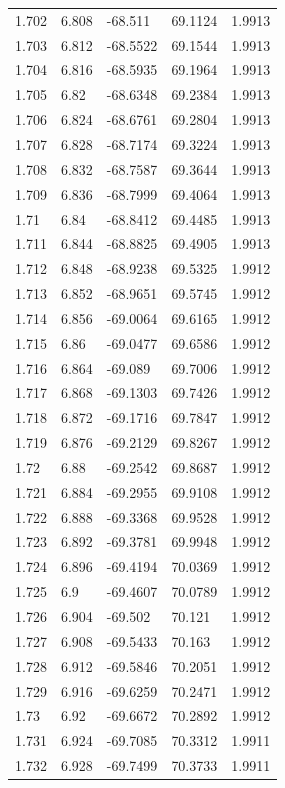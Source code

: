 \begin{tabular}{lllll}
1.702 & 6.808 & -68.511 & 69.1124 & 1.9913 \\
1.703 & 6.812 & -68.5522 & 69.1544 & 1.9913 \\
1.704 & 6.816 & -68.5935 & 69.1964 & 1.9913 \\
1.705 & 6.82 & -68.6348 & 69.2384 & 1.9913 \\
1.706 & 6.824 & -68.6761 & 69.2804 & 1.9913 \\
1.707 & 6.828 & -68.7174 & 69.3224 & 1.9913 \\
1.708 & 6.832 & -68.7587 & 69.3644 & 1.9913 \\
1.709 & 6.836 & -68.7999 & 69.4064 & 1.9913 \\
1.71 & 6.84 & -68.8412 & 69.4485 & 1.9913 \\
1.711 & 6.844 & -68.8825 & 69.4905 & 1.9913 \\
1.712 & 6.848 & -68.9238 & 69.5325 & 1.9912 \\
1.713 & 6.852 & -68.9651 & 69.5745 & 1.9912 \\
1.714 & 6.856 & -69.0064 & 69.6165 & 1.9912 \\
1.715 & 6.86 & -69.0477 & 69.6586 & 1.9912 \\
1.716 & 6.864 & -69.089 & 69.7006 & 1.9912 \\
1.717 & 6.868 & -69.1303 & 69.7426 & 1.9912 \\
1.718 & 6.872 & -69.1716 & 69.7847 & 1.9912 \\
1.719 & 6.876 & -69.2129 & 69.8267 & 1.9912 \\
1.72 & 6.88 & -69.2542 & 69.8687 & 1.9912 \\
1.721 & 6.884 & -69.2955 & 69.9108 & 1.9912 \\
1.722 & 6.888 & -69.3368 & 69.9528 & 1.9912 \\
1.723 & 6.892 & -69.3781 & 69.9948 & 1.9912 \\
1.724 & 6.896 & -69.4194 & 70.0369 & 1.9912 \\
1.725 & 6.9 & -69.4607 & 70.0789 & 1.9912 \\
1.726 & 6.904 & -69.502 & 70.121 & 1.9912 \\
1.727 & 6.908 & -69.5433 & 70.163 & 1.9912 \\
1.728 & 6.912 & -69.5846 & 70.2051 & 1.9912 \\
1.729 & 6.916 & -69.6259 & 70.2471 & 1.9912 \\
1.73 & 6.92 & -69.6672 & 70.2892 & 1.9912 \\
1.731 & 6.924 & -69.7085 & 70.3312 & 1.9911 \\
1.732 & 6.928 & -69.7499 & 70.3733 & 1.9911 \\

\end{tabular}
